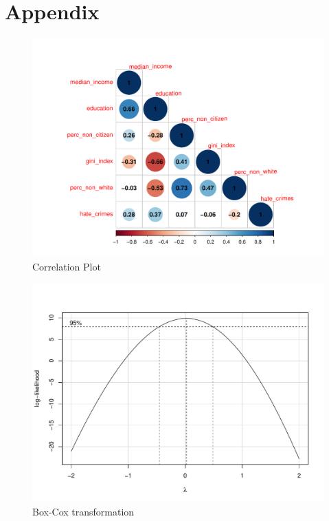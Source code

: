 \documentclass[
  english,
  man]{apa6}
\begin{document}
\endgroup

\hypertarget{appendix}{%
\section{Appendix}\label{appendix}}

\begin{figure}
\centering
\includegraphics{final_paper_files/figure-latex/correlation-1.pdf}
\caption{\label{fig:correlation}Correlation Plot}
\end{figure}

\begin{figure}
\centering
\includegraphics{final_paper_files/figure-latex/log-transformation-1.pdf}
\caption{\label{fig:log-transformation}Box-Cox transformation}
\end{figure}
\end{document}

